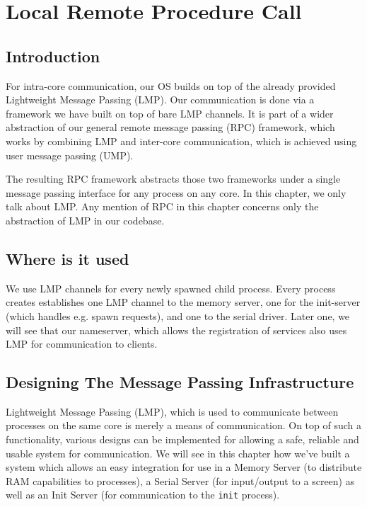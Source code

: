 \chapter{Local Remote Procedure Call}
\section{Introduction}
For intra-core communication, our OS builds on top of the already provided Lightweight Message Passing (LMP).
Our communication is done via a framework we have built on top of bare LMP channels.
It is part of a wider abstraction of our general remote message passing (RPC) framework,
which works by combining LMP and inter-core communication, which is achieved using user message passing (UMP).

The resulting RPC framework abstracts those two frameworks under a single message passing interface
for any process on any core. In this chapter, we only talk about LMP. Any mention of RPC
in this chapter concerns only the abstraction of LMP in our codebase.

\section{Where is it used}
We use LMP channels for every newly spawned child process. Every process creates 
establishes one LMP channel to the memory server, one for the init-server (which handles e.g. spawn requests),
and one to the serial driver. Later one, we will see that our nameserver, which allows the registration of 
services also uses LMP for communication to clients.

\section{Designing The Message Passing Infrastructure}
Lightweight Message Passing (LMP), which is used to communicate between processes
on the same core is merely a means of communication. On top of such a functionality,
various designs can be implemented for allowing a safe, reliable and usable system
for communication. We will see in this chapter how we've built a system which allows
an easy integration for use in a Memory Server (to distribute RAM capabilities 
to processes), a Serial Server (for input/output to a screen) as well as an Init Server 
(for communication to the \texttt{init} process).


